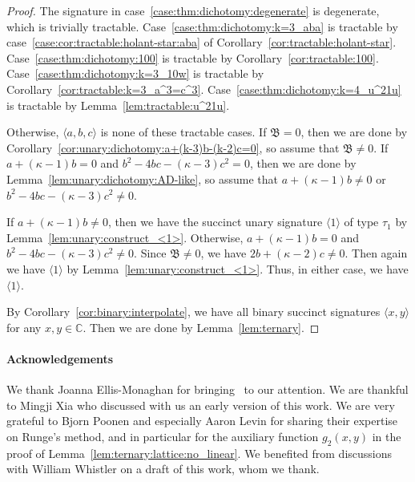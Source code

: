 \documentclass[11pt]{article}
\begin{document}
\begin{proof}
 The signature in case~\ref{case:thm:dichotomy:degenerate} is degenerate,
 which is trivially tractable.
 Case~\ref{case:thm:dichotomy:k=3_aba} is tractable by case~\ref{case:cor:tractable:holant-star:aba} of Corollary~\ref{cor:tractable:holant-star}.
 Case~\ref{case:thm:dichotomy:100} is tractable by Corollary~\ref{cor:tractable:100}.
 Case~\ref{case:thm:dichotomy:k=3_10w} is tractable by Corollary~\ref{cor:tractable:k=3_a^3=c^3}.
 Case~\ref{case:thm:dichotomy:k=4_u^21u} is tractable by Lemma~\ref{lem:tractable:u^21u}.
 
 Otherwise, $\langle a,b,c \rangle$ is none of these tractable cases.
 If $\mathfrak{B} = 0$,
 then we are done by Corollary~\ref{cor:unary:dichotomy:a+(k-3)b-(k-2)c=0},
 so assume that $\mathfrak{B} \ne 0$.
 If $a + (\kappa - 1) b = 0$ and $b^2 - 4 b c - (\kappa - 3) c^2 = 0$,
 then we are done by Lemma~\ref{lem:unary:dichotomy:AD-like},
 so assume that $a + (\kappa - 1) b \ne 0$ or $b^2 - 4 b c - (\kappa - 3) c^2 \ne 0$.
 
 If $a + (\kappa - 1) b \ne 0$,
 then we have the succinct unary signature $\langle 1 \rangle$ of type $\tau_1$ by Lemma~\ref{lem:unary:construct_<1>}.
 Otherwise, $a + (\kappa - 1) b = 0$ and $b^2 - 4 b c - (\kappa - 3) c^2 \ne 0$.
 Since $\mathfrak{B} \ne 0$,
 we have $2 b + (\kappa - 2) c \ne 0$.
 Then again we have $\langle 1 \rangle$ by Lemma~\ref{lem:unary:construct_<1>}.
 Thus, in either case, we have $\langle 1 \rangle$.
 
 By Corollary~\ref{cor:binary:interpolate},
 we have all binary succinct signatures $\langle x,y \rangle$ for any $x,y \in \mathbb{C}$.
 Then we are done by Lemma~\ref{lem:ternary}.
\end{proof}

\paragraph{Acknowledgements}

We thank Joanna Ellis-Monaghan for bringing~\cite{Ell04} to our attention.
We are thankful to Mingji Xia who discussed with us an early version of this work.
We are very grateful to Bjorn Poonen and especially Aaron Levin for sharing their expertise on Runge's method,
and in particular for the auxiliary function $g_2(x, y)$ in the proof of Lemma~\ref{lem:ternary:lattice:no_linear}.
We benefited from discussions with William Whistler on a draft of this work,
whom we thank.
\end{document}
